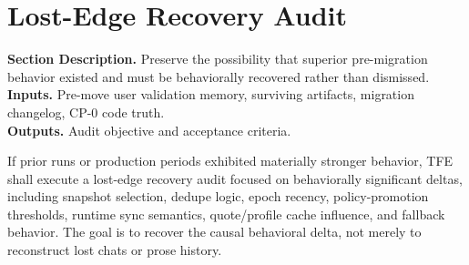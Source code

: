 \documentclass[11pt]{report}
\newcommand{\meta}[3]{\textbf{Section Description.} #1\\
\textbf{Inputs.} #2\\
\textbf{Outputs.} #3\par}
\begin{document}
\section{Lost-Edge Recovery Audit}
\meta{Preserve the possibility that superior pre-migration behavior existed and must be behaviorally recovered rather than dismissed.}{Pre-move user validation memory, surviving artifacts, migration changelog, CP-0 code truth.}{Audit objective and acceptance criteria.}

If prior runs or production periods exhibited materially stronger behavior, TFE shall execute a lost-edge recovery audit focused on behaviorally significant deltas, including snapshot selection, dedupe logic, epoch recency, policy-promotion thresholds, runtime sync semantics, quote/profile cache influence, and fallback behavior. The goal is to recover the causal behavioral delta, not merely to reconstruct lost chats or prose history.
\end{document}
